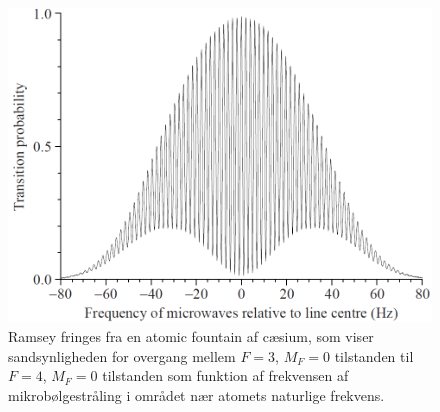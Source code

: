 \begin{figure}[!h]
    \centering
    \includegraphics[width=.75\textwidth]{Q04/images/RamseyFringes.PNG}
    \caption{Ramsey fringes fra en atomic fountain af cæsium, som viser sandsynligheden for overgang mellem $F = 3$, $M_F = 0$ tilstanden til $F = 4$, $M_F = 0$ tilstanden som funktion af frekvensen af mikrobølgestråling i området nær atomets naturlige frekvens.}
    \label{fig:Q04_RamseyFringes}
\end{figure}